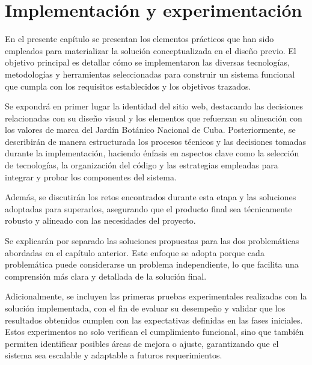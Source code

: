 \chapter{Implementación y experimentación}\label{chapter:implementation}
En el presente capítulo se presentan los elementos prácticos que han sido empleados para 
materializar la solución conceptualizada en el diseño previo. El objetivo principal es 
detallar cómo se implementaron las diversas tecnologías, metodologías y herramientas 
seleccionadas para construir un sistema funcional que cumpla con los 
requisitos establecidos y los objetivos trazados.

Se expondrá en primer lugar la identidad del sitio web, destacando las decisiones relacionadas 
con su diseño visual y los elementos que refuerzan su alineación con los valores de marca del 
Jardín Botánico Nacional de Cuba. Posteriormente, se describirán de manera estructurada los 
procesos técnicos y las decisiones tomadas durante la implementación, haciendo énfasis en 
aspectos clave como la selección de tecnologías, la organización del código y las estrategias 
empleadas para integrar y probar los componentes del sistema.

Además, se discutirán los retos encontrados durante esta etapa y las soluciones 
adoptadas para superarlos, asegurando que el producto final sea técnicamente robusto 
y alineado con las necesidades del proyecto.

Se explicarán por separado las soluciones propuestas para las dos problemáticas 
abordadas en el capítulo anterior. Este enfoque se adopta porque cada problemática puede 
considerarse un problema independiente, lo que facilita una comprensión más clara y detallada 
de la solución final.

Adicionalmente, se incluyen las primeras pruebas experimentales realizadas con la solución implementada, 
con el fin de evaluar su desempeño y validar que los resultados obtenidos cumplen con las 
expectativas definidas en las fases iniciales. Estos experimentos no solo verifican el cumplimiento 
funcional, sino que también permiten identificar posibles áreas de mejora o ajuste, 
garantizando que el sistema sea escalable y adaptable a futuros requerimientos.



